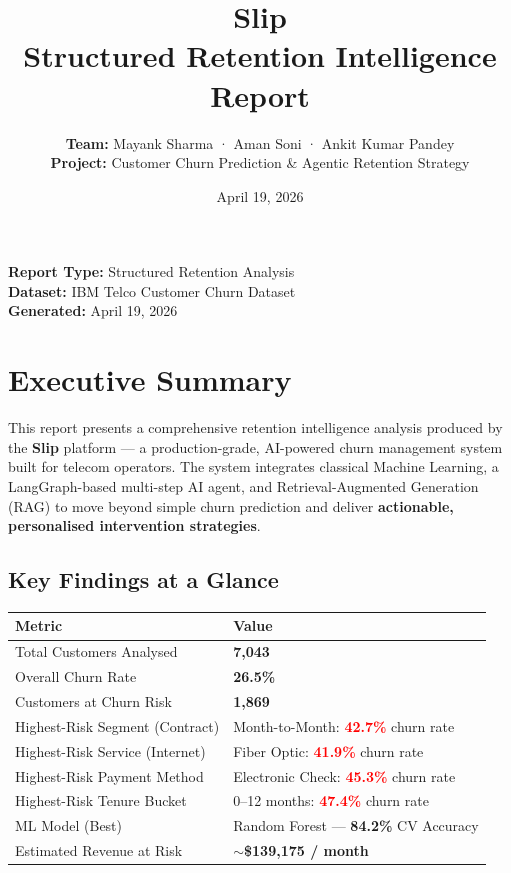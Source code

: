 \documentclass[11pt,a4paper]{article}
\title{\Huge \textbf{Slip} \\ \Large Structured Retention Intelligence Report}
\author{\textbf{Team:} Mayank Sharma · Aman Soni · Ankit Kumar Pandey \\ \textbf{Project:} Customer Churn Prediction \& Agentic Retention Strategy}
\date{April 19, 2026}
\newcommand{\risk}[1]{\textbf{\textcolor{red}{#1}}}
\newcommand{\success}[1]{\textbf{\textcolor{green!50!black}{#1}}}
\begin{document}
\maketitle

\begin{tcolorbox}[colback=background, colframe=primary, title=Report Metadata]
\textbf{Report Type:} Structured Retention Analysis \\
\textbf{Dataset:} IBM Telco Customer Churn Dataset \\
\textbf{Generated:} April 19, 2026
\end{tcolorbox}

\newpage

\tableofcontents

\newpage

\section{Executive Summary}

This report presents a comprehensive retention intelligence analysis produced by the \textbf{Slip} platform — a production-grade, AI-powered churn management system built for telecom operators. The system integrates classical Machine Learning, a LangGraph-based multi-step AI agent, and Retrieval-Augmented Generation (RAG) to move beyond simple churn prediction and deliver \textbf{actionable, personalised intervention strategies}.

\subsection{Key Findings at a Glance}

\begin{table}[h!]
\centering
\begin{tabularx}{\textwidth}{l X}
\toprule
\textbf{Metric} & \textbf{Value} \\
\midrule
Total Customers Analysed & \textbf{7,043} \\
Overall Churn Rate & \textbf{26.5\%} \\
Customers at Churn Risk & \textbf{1,869} \\
Highest-Risk Segment (Contract) & Month-to-Month: \risk{42.7\%} churn rate \\
Highest-Risk Service (Internet) & Fiber Optic: \risk{41.9\%} churn rate \\
Highest-Risk Payment Method & Electronic Check: \risk{45.3\%} churn rate \\
Highest-Risk Tenure Bucket & 0–12 months: \risk{47.4\%} churn rate \\
ML Model (Best) & Random Forest — \success{84.2\%} CV Accuracy \\
Estimated Revenue at Risk & $\sim$\textbf{\$139,175 / month} \\
\bottomrule
\end{tabularx}
\end{table}
\end{document}
